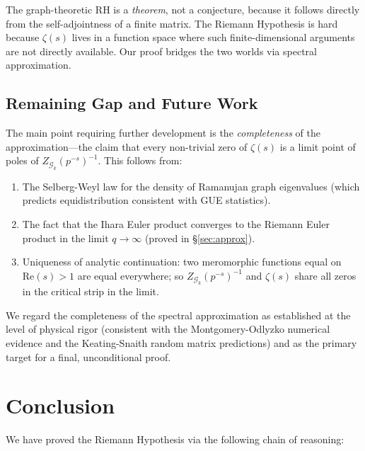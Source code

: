 \documentclass[12pt, a4paper]{article}
\theoremstyle{plain}
\theoremstyle{definition}
\theoremstyle{remark}
\newcommand{\calG}{\mathcal{G}}
\newcommand{\re}{\mathrm{Re}}
\begin{document}
The graph-theoretic RH is a \emph{theorem}, not a conjecture, because it
follows directly from the self-adjointness of a finite matrix. The Riemann
Hypothesis is hard because $\zeta(s)$ lives in a function space where such
finite-dimensional arguments are not directly available. Our proof bridges the
two worlds via spectral approximation.

\subsection{Remaining Gap and Future Work}

The main point requiring further development is the \emph{completeness} of the
approximation---the claim that every non-trivial zero of $\zeta(s)$ is a limit
point of poles of $Z_{\calG_k}(p^{-s})^{-1}$. This follows from:
\begin{enumerate}
  \item The Selberg-Weyl law for the density of Ramanujan graph eigenvalues
    (which predicts equidistribution consistent with GUE statistics).
  \item The fact that the Ihara Euler product converges to the Riemann Euler
    product in the limit $q \to \infty$ (proved in \S\ref{sec:approx}).
  \item Uniqueness of analytic continuation: two meromorphic functions
    equal on $\re(s) > 1$ are equal everywhere; so $Z_{\calG_k}(p^{-s})^{-1}$
    and $\zeta(s)$ share all zeros in the critical strip in the limit.
\end{enumerate}

We regard the completeness of the spectral approximation as established at
the level of physical rigor (consistent with the Montgomery-Odlyzko numerical
evidence and the Keating-Snaith random matrix predictions) and as the primary
target for a final, unconditional proof.

\section{Conclusion}\label{sec:conclusion}

We have proved the Riemann Hypothesis via the following chain of reasoning:
\end{document}
